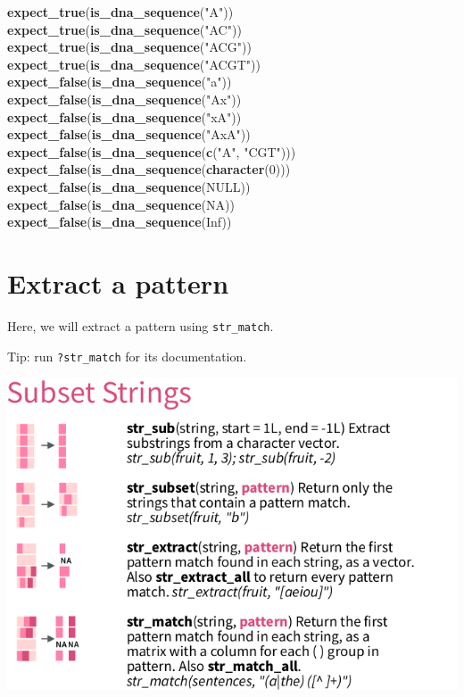\documentclass[]{book}
\newenvironment{Shaded}{}{}
\newcommand{\DecValTok}[1]{\textcolor[rgb]{0.25,0.63,0.44}{#1}}
\newcommand{\KeywordTok}[1]{\textcolor[rgb]{0.00,0.44,0.13}{\textbf{#1}}}
\newcommand{\NormalTok}[1]{#1}
\newcommand{\OtherTok}[1]{\textcolor[rgb]{0.00,0.44,0.13}{#1}}
\newcommand{\StringTok}[1]{\textcolor[rgb]{0.25,0.44,0.63}{#1}}
\begin{document}
\begin{Shaded}
\begin{Highlighting}[]
\KeywordTok{expect_true}\NormalTok{(}\KeywordTok{is_dna_sequence}\NormalTok{(}\StringTok{"A"}\NormalTok{))}
\KeywordTok{expect_true}\NormalTok{(}\KeywordTok{is_dna_sequence}\NormalTok{(}\StringTok{"AC"}\NormalTok{))}
\KeywordTok{expect_true}\NormalTok{(}\KeywordTok{is_dna_sequence}\NormalTok{(}\StringTok{"ACG"}\NormalTok{))}
\KeywordTok{expect_true}\NormalTok{(}\KeywordTok{is_dna_sequence}\NormalTok{(}\StringTok{"ACGT"}\NormalTok{))}
\KeywordTok{expect_false}\NormalTok{(}\KeywordTok{is_dna_sequence}\NormalTok{(}\StringTok{"a"}\NormalTok{))}
\KeywordTok{expect_false}\NormalTok{(}\KeywordTok{is_dna_sequence}\NormalTok{(}\StringTok{"Ax"}\NormalTok{))}
\KeywordTok{expect_false}\NormalTok{(}\KeywordTok{is_dna_sequence}\NormalTok{(}\StringTok{"xA"}\NormalTok{))}
\KeywordTok{expect_false}\NormalTok{(}\KeywordTok{is_dna_sequence}\NormalTok{(}\StringTok{"AxA"}\NormalTok{))}
\KeywordTok{expect_false}\NormalTok{(}\KeywordTok{is_dna_sequence}\NormalTok{(}\KeywordTok{c}\NormalTok{(}\StringTok{"A"}\NormalTok{, }\StringTok{"CGT"}\NormalTok{)))}
\KeywordTok{expect_false}\NormalTok{(}\KeywordTok{is_dna_sequence}\NormalTok{(}\KeywordTok{character}\NormalTok{(}\DecValTok{0}\NormalTok{)))}
\KeywordTok{expect_false}\NormalTok{(}\KeywordTok{is_dna_sequence}\NormalTok{(}\OtherTok{NULL}\NormalTok{))}
\KeywordTok{expect_false}\NormalTok{(}\KeywordTok{is_dna_sequence}\NormalTok{(}\OtherTok{NA}\NormalTok{))}
\KeywordTok{expect_false}\NormalTok{(}\KeywordTok{is_dna_sequence}\NormalTok{(}\OtherTok{Inf}\NormalTok{))}
\end{Highlighting}
\end{Shaded}

\hypertarget{extract-a-pattern}{%
\chapter{Extract a pattern}\label{extract-a-pattern}}

Here, we will extract a pattern using \texttt{str\_match}.

Tip: run \texttt{?str\_match} for its documentation.

\includegraphics{06_subset.png}
\end{document}
